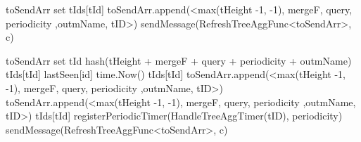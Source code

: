 \begin{algorithm}
\begin{algorithmic}[1]
     \label{alg:mon:tree_agg:propag}
        \State toSendArr \asdassign set 
            \State <tHeight, mergeF, query, periodicity, outmName, isLocal, isParentSub, ptId> \asdassign tIds[tId]
                \State toSendArr.append(<max(tHeight -1, -1), mergeF, query, periodicity ,outmName, tID>)
            \EndIf
        \EndFor
            \State sendMessage(RefreshTreeAggFunc<toSendArr>, c)
        \EndFor
    \asdend

     \label{alg:mon:tree_agg:propag_recv}
            \State toSendArr \asdassign set 
                \State tId \asdassign hash(tHeight + mergeF + query + periodicity + outmName)
                    \State <tHeight, mergeF, query, periodicity, outmName, isLocal, isParentSub, ptId> \asdassign tIds[tId]
                    \State lastSeen[id] \asdassign time.Now()
                    \State tIds[tId] \asdassign <tHeight, mergeF, query, periodicity, outmName, isLocal, true, ptId>
                        \State toSendArr.append(<max(tHeight -1, -1), mergeF, query, periodicity ,outmName, tID>)
                    \EndIf
                \Else
                    \State toSendArr.append(<max(tHeight -1, -1), mergeF, query, periodicity ,outmName, tID>)
                    \State tIds[tId] \asdassign <tHeight, mergeF, query, periodicity, outmName, false, true, ptId>
                    \State registerPeriodicTimer(HandleTreeAggTimer(tID), periodicity)
                \EndIf
            \EndFor
                \State sendMessage(RefreshTreeAggFunc<toSendArr>, c)
            \EndFor
        \EndIf
    \asdend

    \end{algorithmic}
\end{algorithm}
    